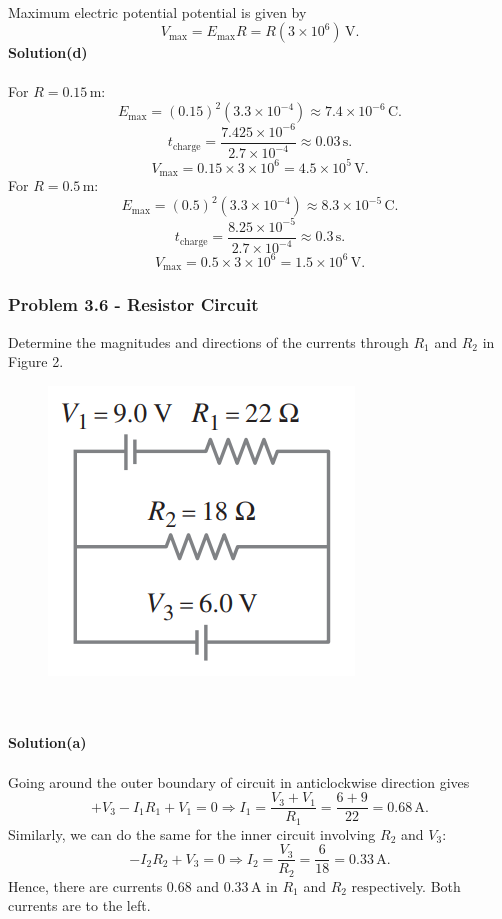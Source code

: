 \documentclass{article}
\begin{document}
\\Maximum electric potential potential is given by
\[V_{\text{max}}=E_{\text{max}}R=R(3\times10^6)\,\text{V}.\]
\textbf{Solution(d)}
\\
\\For $R=0.15\,$m:
\[E_{\text{max}}=(0.15)^2(3.3\times10^{-4})\approx7.4\times10^{-6}\,\text{C}.\]
\[t_{\text{charge}}=\frac{7.425\times10^{-6}}{2.7\times10^{-4}}\approx0.03\,\text{s}.\]
\[V_{\text{max}}=0.15\times3\times10^6=4.5\times10^5\,\text{V}.\]
For $R=0.5\,$m:
\[E_{\text{max}}=(0.5)^2(3.3\times10^{-4})\approx8.3\times10^{-5}\,\text{C}.\]
\[t_{\text{charge}}=\frac{8.25\times10^{-5}}{2.7\times10^{-4}}\approx0.3\,\text{s}.\]
\[V_{\text{max}}=0.5\times3\times10^6=1.5\times10^6\,\text{V}.\]

\newpage

\subsubsection*{Problem 3.6 - Resistor Circuit}
Determine the magnitudes and directions of the currents through $R_1$ and $R_2$ in Figure 2.
\begin{figure}[h]
    \centering
    \includegraphics[width=0.25\linewidth]{figs/fig_prob_3.6.png}
    \caption{}
    \label{fig:enter-label}
\end{figure}
\\
\\\textbf{Solution(a)}
\\
\\Going around the outer boundary of circuit in anticlockwise direction gives
\[+V_3-I_1R_1+V_1=0\Rightarrow I_1=\frac{V_3+V_1}{R_1}=\frac{6+9}{22}=0.68\,\text{A}.\]
Similarly, we can do the same for the inner circuit involving $R_2$ and $V_3$:
\[-I_2R_2+V_3=0\Rightarrow I_2=\frac{V_3}{R_2}=\frac{6}{18}=0.33\,\text{A}.\]
Hence, there are currents 0.68 and 0.33\,A in $R_1$ and $R_2$ respectively. Both currents are to the left.
\end{document}
